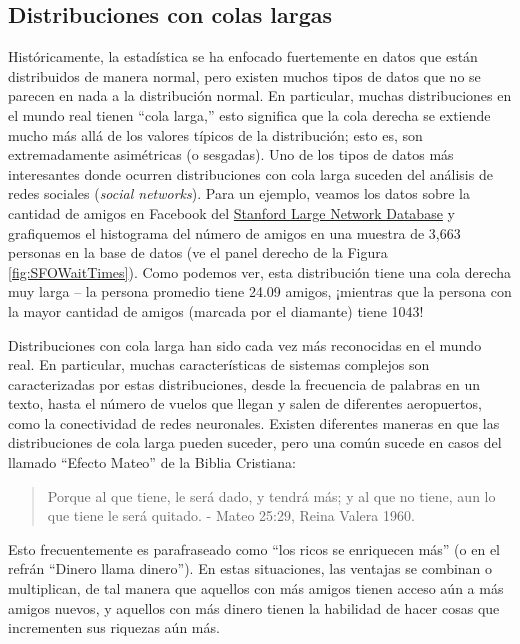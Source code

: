 \documentclass[
  12pt,
]{book}
\begin{document}
\hypertarget{distribuciones-con-colas-largas}{%
\subsection{Distribuciones con colas largas}\label{distribuciones-con-colas-largas}}

Históricamente, la estadística se ha enfocado fuertemente en datos que están distribuidos de manera normal, pero existen muchos tipos de datos que no se parecen en nada a la distribución normal. En particular, muchas distribuciones en el mundo real tienen ``cola larga,'' esto significa que la cola derecha se extiende mucho más allá de los valores típicos de la distribución; esto es, son extremadamente asimétricas (o sesgadas). Uno de los tipos de datos más interesantes donde ocurren distribuciones con cola larga suceden del análisis de redes sociales (\emph{social networks}). Para un ejemplo, veamos los datos sobre la cantidad de amigos en Facebook del \href{https://snap.stanford.edu/data/egonets-Facebook.html}{Stanford Large Network Database} y grafiquemos el histograma del número de amigos en una muestra de 3,663 personas en la base de datos (ve el panel derecho de la Figura \ref{fig:SFOWaitTimes}). Como podemos ver, esta distribución tiene una cola derecha muy larga -- la persona promedio tiene 24.09 amigos, ¡mientras que la persona con la mayor cantidad de amigos (marcada por el diamante) tiene 1043!

Distribuciones con cola larga han sido cada vez más reconocidas en el mundo real. En particular, muchas características de sistemas complejos son caracterizadas por estas distribuciones, desde la frecuencia de palabras en un texto, hasta el número de vuelos que llegan y salen de diferentes aeropuertos, como la conectividad de redes neuronales. Existen diferentes maneras en que las distribuciones de cola larga pueden suceder, pero una común sucede en casos del llamado ``Efecto Mateo'' de la Biblia Cristiana:

\begin{quote}
Porque al que tiene, le será dado, y tendrá más; y al que no tiene, aun lo que tiene le será quitado. - Mateo 25:29, Reina Valera 1960.
\end{quote}

Esto frecuentemente es parafraseado como ``los ricos se enriquecen más'' (o en el refrán ``Dinero llama dinero''). En estas situaciones, las ventajas se combinan o multiplican, de tal manera que aquellos con más amigos tienen acceso aún a más amigos nuevos, y aquellos con más dinero tienen la habilidad de hacer cosas que incrementen sus riquezas aún más.
\end{document}

